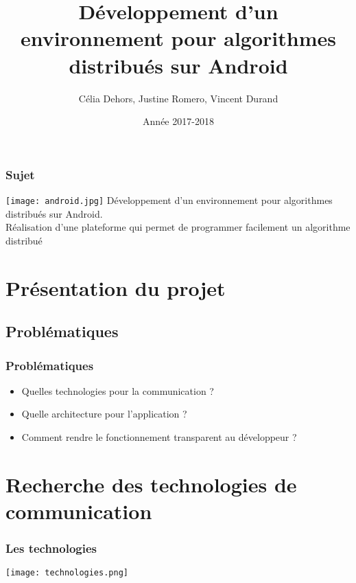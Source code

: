 \documentclass{beamer}
\title{Développement d’un environnement pour algorithmes distribués sur Android}
\author{Célia Dehors, Justine Romero, Vincent Durand}
\institute{Université de Franche-Comté}
\date{Année 2017-2018}
\begin{document}
    \begin{frame}[plain]
        \titlepage
    \end{frame}
	\begin{frame}
	  \frametitle{Sujet}
	  \texttt{[image: android.jpg]}
	  Développement d’un environnement pour algorithmes distribués sur Android.
	  \\Réalisation d’une plateforme qui permet de programmer facilement un algorithme distribué
        \end{frame}
    \begin{frame}
        \tableofcontents
    \end{frame}
    \section{Présentation du projet}
      \subsection{Problématiques}
        \begin{frame}
	  \frametitle{Problématiques}
	  \begin{itemize}
	   \item Quelles technologies pour la communication ?
	   \item Quelle architecture pour l'application ?
	   \item Comment rendre le fonctionnement transparent au développeur ?
	  \end{itemize}

        \end{frame}
    
    \section{Recherche des technologies de communication}
      \begin{frame}
	\frametitle{Les technologies}
	\texttt{[image: technologies.png]}
      \end{frame}
\end{document}

